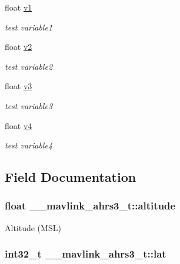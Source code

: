 \begin{DoxyCompactItemize}
float \hyperlink{struct____mavlink__ahrs3__t_a17bb34e1ad16f876065e11f3f4efaa1b}{v1}
\begin{DoxyCompactList}\small\item\em test variable1 \end{DoxyCompactList}\item 
float \hyperlink{struct____mavlink__ahrs3__t_a04cb7fc00c480230de61e8c90b170343}{v2}
\begin{DoxyCompactList}\small\item\em test variable2 \end{DoxyCompactList}\item 
float \hyperlink{struct____mavlink__ahrs3__t_ab23392588c1f0b8652ca7dcabb2bc24f}{v3}
\begin{DoxyCompactList}\small\item\em test variable3 \end{DoxyCompactList}\item 
float \hyperlink{struct____mavlink__ahrs3__t_ad05431d92d5ae17adf54ec2879622b95}{v4}
\begin{DoxyCompactList}\small\item\em test variable4 \end{DoxyCompactList}\end{DoxyCompactItemize}


\subsection{Field Documentation}
\hypertarget{struct____mavlink__ahrs3__t_af0c11044e608b509b9d84adcc93b146b}{
\subsubsection[{altitude}]{\setlength{\rightskip}{0pt plus 5cm}float \+\_\+\+\_\+mavlink\+\_\+ahrs3\+\_\+t\+::altitude}}\label{struct____mavlink__ahrs3__t_af0c11044e608b509b9d84adcc93b146b}


Altitude (M\+S\+L) 

\hypertarget{struct____mavlink__ahrs3__t_a0ca3576a6aae648a8c33b670ed32f3be}{
\subsubsection[{lat}]{\setlength{\rightskip}{0pt plus 5cm}int32\+\_\+t \+\_\+\+\_\+mavlink\+\_\+ahrs3\+\_\+t\+::lat}}\label{struct____mavlink__ahrs3__t_a0ca3576a6aae648a8c33b670ed32f3be}


